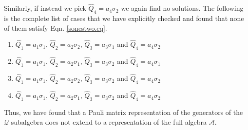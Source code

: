 \documentclass[11pt]{article}
\newcommand{\hQ}{\hat Q}
\newcommand{\cA}{\mathcal A}
\newcommand{\cQ}{\mathcal Q}
\begin{document}
Similarly, if instead we pick $\hQ_4=a_4\sigma_2$ we again find no
solutions.  The following is the complete list of cases that we have
explicitly checked and found that none of them 
satisfy Eqn. \eqref{sonestwo.eq}. 
\begin{enumerate}
\item $\hQ_1=a_1\sigma_1 $, $\hQ_2=a_2\sigma_2$, $\hQ_3=a_3\sigma_1$ and $\hQ_4=a_4\sigma_2$
\item $\hQ_1=a_1\sigma_1 $, $\hQ_2=a_2\sigma_1$, $\hQ_3=a_3\sigma_2$ and $\hQ_4=a_4\sigma_1$
\item $\hQ_1=a_1\sigma_1 $, $\hQ_2=a_2\sigma_2$, $\hQ_3=a_3\sigma_2$ and $\hQ_4=a_4\sigma_2$
\item  $\hQ_1=a_1\sigma_1 $, $\hQ_2=a_2\sigma_1$, $\hQ_3=a_3\sigma_2$ and $\hQ_4=a_4\sigma_2$
\end{enumerate} 
Thus, we have found that a Pauli matrix representation of the
generators of the $\cQ$ subalgebra does
 not  extend to a representation of the full algebra $\cA$. 


 
  
\end{document}
